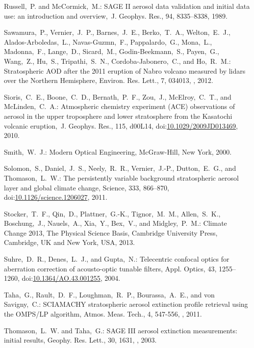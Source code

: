 \documentclass[amtd, online, hvmath]{copernicus}
\begin{document}
\begin{thebibliography}{99}
Russell,~P. and McCormick,~M.: SAGE II aerosol data validation and initial
data use: an introduction and overview,~J. Geophys. Res., 94, 8335--8338,
1989.


Sawamura,~P., Vernier,~J.~P., Barnes,~J.~E., Berko,~T.~A., Welton,~E.~J.,
Alados-Arboledas,~L., Navas-Guzmn,~F., Pappalardo,~G., Mona,~L., Madonna,~F.,
Lange,~D., Sicard,~M., Godin-Beekmann,~S., Payen,~G., Wang,~Z., Hu,~S.,
Tripathi,~S.~N., Cordoba-Jabonero,~C., and Ho,~R.~M.: Stratospheric AOD after
the 2011 eruption of Nabro volcano measured by lidars over the Northern
Hemisphere, Environ. Res. Lett., 7, 034013,
, 2012.


Sioris,~C.~E., Boone,~C.~D., Bernath,~P.~F., Zou,~J., McElroy,~C.~T., and
McLinden,~C.~A.: Atmospheric chemistry experiment (ACE) observations of
aerosol in the upper troposphere and lower stratosphere from the Kasatochi
volcanic eruption,~J. Geophys. Res., 115, d00L14,
doi:\href{http://dx.doi.org/10.1029/2009JD013469}{10.1029/2009JD013469},
2010.


Smith,~W.~J.: Modern Optical Engineering, McGraw-Hill, New York, 2000.


Solomon,~S., Daniel,~J.~S., Neely,~R.~R., Vernier,~J.-P., Dutton,~E.~G., and
Thomason,~L.~W.: The persistently variable background stratospheric aerosol
layer and global climate change, Science, 333, 866--870,
doi:\href{http://dx.doi.org/10.1126/science.1206027}{10.1126/science.1206027},
2011.


Stocker,~T.~F., Qin,~D., Plattner,~G.-K., Tignor,~M.~M., Allen,~S.~K.,
Boschung,~J., Nauels,~A., Xia,~Y., Bex,~V., and Midgley,~P.~M.: Climate
Change 2013, The Physical Science Basis, Cambridge University Press,
Cambridge, UK and New York, USA, 2013.


Suhre,~D.~R., Denes,~L.~J., and Gupta,~N.: Telecentric confocal optics for
aberration correction of acousto-optic tunable filters, Appl. Optics, 43,
1255--1260,
doi:\href{http://dx.doi.org/10.1364/AO.43.001255}{10.1364/AO.43.001255},
2004.

Taha,~G., Rault,~D.~F., Loughman,~R.~P., Bourassa,~A.~E., and von Savigny,~C.:
SCIAMACHY stratospheric aerosol extinction profile retrieval using the OMPS/LP
algorithm, Atmos. Meas. Tech., 4, 547-556, , 2011.

Thomason,~L.~W. and Taha,~G.: SAGE III aerosol extinction measurements:
initial results, Geophy. Res. Lett., 30, 1631, ,
2003.



\end{thebibliography}
\end{document}
